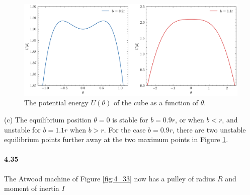 \documentclass[../problems.tex]{subfiles}
\begin{document}
\begin{figure}[ht]
    \centering
    \includegraphics[scale=0.7]{../images/fig4_33b.png}
    \captionsetup{width=0.8\textwidth}
    \caption{The potential energy $U(\theta)$ of the cube as a function of $\theta$.}
    \label{fig:4_33b}
\end{figure}

(c) The equilibrium position $\theta = 0$ is stable for $b = 0.9r$, or when $b < r$, and unstable
for $b = 1.1r$ when $b > r$. For the case $b = 0.9r$, there are two unstable equilibrium points
further away at the two maximum points in Figure \ref{fig:4_33b}.

\paragraph{4.35}
The Atwood machine of Figure \ref{fig:4_33} now has a pulley of radius $R$ and moment of inertia $I$
\end{document}
